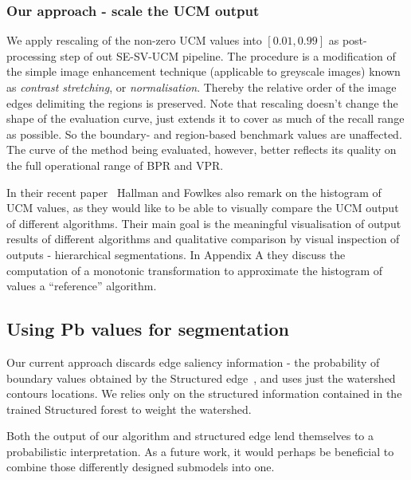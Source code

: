 \subsubsection{Our approach - scale the UCM output} %
We apply rescaling of the non-zero UCM values into $[0.01, 0.99]$ as post-processing step of out SE-SV-UCM pipeline. The procedure is a modification of the simple image enhancement technique (applicable to greyscale images) known as {\it contrast stretching}, or {\it normalisation}. Thereby the relative order of the image edges delimiting the regions is preserved. Note that rescaling doesn't change the shape of the evaluation curve, just extends it to cover as much of the recall range as possible. So the boundary- and region-based benchmark values are unaffected. The curve of the method being evaluated, however, better reflects its quality on the full operational range of BPR and VPR.

In their recent paper~\cite{Hallman2014} Hallman and Fowlkes also remark on the histogram of UCM values, as they would like to be able to visually compare the UCM output of different algorithms. Their main goal is the meaningful visualisation of output results of different algorithms and qualitative comparison by visual inspection of outputs - hierarchical segmentations. In Appendix A they discuss the computation of a monotonic transformation to approximate the histogram of values \wrt a ``reference'' algorithm.

\subsection{Using Pb values for segmentation} %
Our current approach discards edge saliency information - the probability of boundary values obtained by the Structured edge~\cite{DollarICCV13edges}, and uses just the watershed contours locations. We relies only on the structured information contained in the trained Structured forest to weight the watershed.

Both the output of our algorithm and structured edge lend themselves to %
a probabilistic interpretation. As a future work, it would perhaps be beneficial to combine those differently designed submodels into one.
